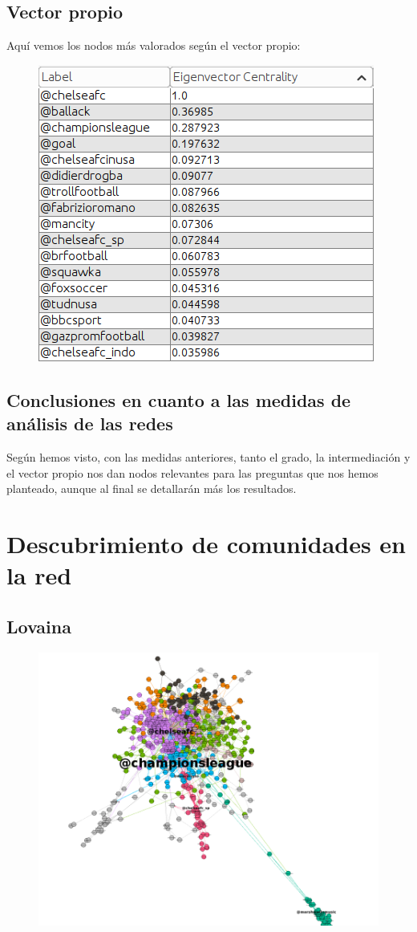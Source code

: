 \subsection{Vector propio}
Aquí vemos los nodos más valorados según el vector propio:
\begin{figure}[H]
	\centering
	\includegraphics[width=0.6\linewidth]{Imagenes/screenshot013}
\end{figure}


\subsection{Conclusiones en cuanto a las medidas de análisis de las redes}

Según hemos visto, con las medidas anteriores, tanto el grado, la intermediación y el vector propio nos dan nodos relevantes para las preguntas que nos hemos planteado, aunque al final se detallarán más los resultados.

\section{Descubrimiento de comunidades en la red}

\subsection{Lovaina}

\begin{figure}[H]
	\centering
	\includegraphics[width=0.7\linewidth]{Imagenes/screenshot014}
\end{figure}

